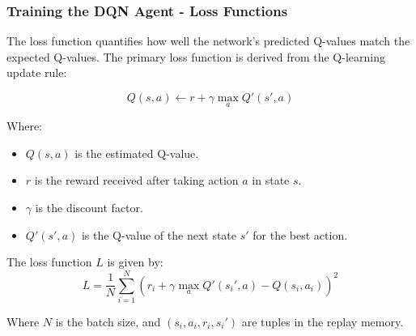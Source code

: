 \documentclass{beamer}
\begin{document}
\begin{frame}
    \frametitle{Training the DQN Agent - Loss Functions}
    The loss function quantifies how well the network's predicted Q-values match the expected Q-values. The primary loss function is derived from the Q-learning update rule:
    
    \begin{equation}
        Q(s, a) \leftarrow r + \gamma \max_a Q'(s', a)
    \end{equation}
    
    Where:
    \begin{itemize}
        \item $Q(s, a)$ is the estimated Q-value.
        \item $r$ is the reward received after taking action $a$ in state $s$.
        \item $\gamma$ is the discount factor.
        \item $Q'(s', a)$ is the Q-value of the next state $s'$ for the best action.
    \end{itemize}
    
    The loss function $L$ is given by:
    \begin{equation}
        L = \frac{1}{N} \sum_{i=1}^{N} \left(r_i + \gamma \max_a Q'(s_i', a) - Q(s_i, a_i)\right)^2
    \end{equation}
    
    Where $N$ is the batch size, and $(s_i, a_i, r_i, s_i')$ are tuples in the replay memory.
\end{frame}
\end{document}
